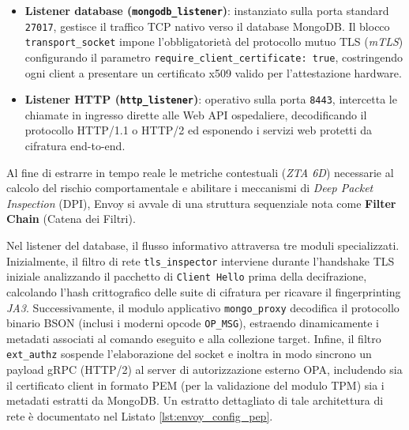 \begin{itemize}
    \item \textbf{Listener database (\texttt{mongodb\_listener})}: instanziato sulla porta standard \texttt{27017}, gestisce il traffico TCP nativo verso il database MongoDB. Il blocco \texttt{transport\_socket} impone l'obbligatorietà del protocollo mutuo TLS (\textit{mTLS}) configurando il parametro \texttt{require\_client\_certificate: true}, costringendo ogni client a presentare un certificato x509 valido per l'attestazione hardware.
    \item \textbf{Listener HTTP (\texttt{http\_listener})}: operativo sulla porta \texttt{8443}, intercetta le chiamate in ingresso dirette alle Web API ospedaliere, decodificando il protocollo HTTP/1.1 o HTTP/2 ed esponendo i servizi web protetti da cifratura end-to-end.
\end{itemize}

Al fine di estrarre in tempo reale le metriche contestuali (\textit{ZTA 6D}) necessarie al calcolo del rischio comportamentale e abilitare i meccanismi di \textit{Deep Packet Inspection} (DPI), Envoy si avvale di una struttura sequenziale nota come \textbf{Filter Chain} (Catena dei Filtri). 

Nel listener del database, il flusso informativo attraversa tre moduli specializzati. Inizialmente, il filtro di rete \texttt{tls\_inspector} interviene durante l'handshake TLS iniziale analizzando il pacchetto di \texttt{Client Hello} prima della decifrazione, calcolando l'hash crittografico delle suite di cifratura per ricavare il fingerprinting \textit{JA3}. Successivamente, il modulo applicativo \texttt{mongo\_proxy} decodifica il protocollo binario BSON (inclusi i moderni opcode \texttt{OP\_MSG}), estraendo dinamicamente i metadati associati al comando eseguito e alla collezione target. Infine, il filtro \texttt{ext\_authz} sospende l'elaborazione del socket e inoltra in modo sincrono un payload gRPC (HTTP/2) al server di autorizzazione esterno OPA, includendo sia il certificato client in formato PEM (per la validazione del modulo TPM) sia i metadati estratti da MongoDB. Un estratto dettagliato di tale architettura di rete è documentato nel Listato \ref{lst:envoy_config_pep}.

